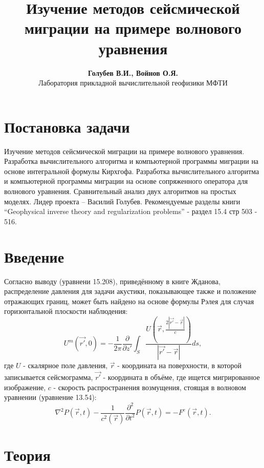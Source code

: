\documentclass{article}
\begin{document}
\title{Изучение методов сейсмической миграции на примере волнового уравнения}
\author{\textbf{Голубев В.И., Войнов О.Я.} \\ Лаборатория прикладной вычислительной геофизики МФТИ}
\maketitle

\section{Постановка задачи}
Изучение методов сейсмической миграции на примере волнового уравнения.
Разработка вычислительного алгоритма и компьютерной программы миграции на основе интегральной формулы Кирхгофа.
Разработка вычислительного алгоритма и компьютерной программы миграции на основе сопряженного оператора для волнового уравнения.
Сравнительный анализ двух алгоритмов на простых моделях.
Лидер проекта – Василий Голубев.
Рекомендуемые разделы книги “Geophysical inverse theory and regularization problems” - раздел 15.4 стр 503 - 516.


\section{Введение}

Согласно выводу (уравнени 15.208), приведённому в книге Жданова, распределение давления для
задачи акустики, показывающее также и положение отражающих границ,
может быть найдено на основе формулы Рэлея для случая горизонтальной плоскости
наблюдения:
\begin{equation}
\label{rayleigh_migration}
U^m(\vec{r'},0) = -\frac{1}{2\pi}\frac{\partial}{\partial z'}
	\int_S \frac{U(\vec{r},\frac{2|\vec{r'}-\vec{r}|}{c})}{|\vec{r'}-\vec{r}|}ds,
\end{equation}
где $U$ - скалярное поле давления, $\vec{r}$ - координата на поверхности, в которой записывается
сейсмограмма, $\vec{r'}$ - координата в объёме, где ищется мигрированное изображение, $c$ - скорость распространения возмущения, стоящая в волновом уравнении (уравнение 13.54):
\begin{equation}
\label{wave_equation}
\nabla^2P(\vec{r},t) - \frac{1}{c^2(\vec{r})}\frac{\partial^2}{\partial t^2}
	P(\vec{r},t) = - F^e(\vec{r},t).
\end{equation}

\section{Теория}
\end{document}
